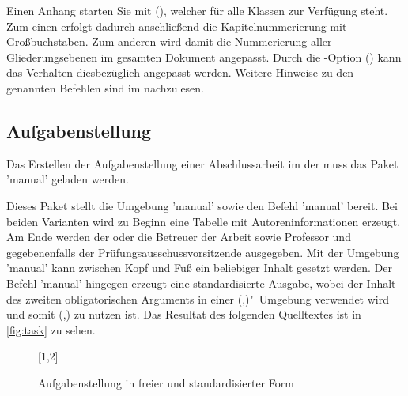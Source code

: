 \documentclass[%
  english,ngerman,%
  cdgeometry=no,DIV=12,%
  automark,%
  listof=toc,%
]{tudscrartcl}
\begin{document}
Einen Anhang starten Sie mit (), welcher 
für alle Klassen zur Verfügung steht. Zum einen erfolgt dadurch anschließend 
die Kapitelnummerierung mit Großbuchstaben. Zum anderen wird damit die 
Nummerierung aller Gliederungsebenen im gesamten Dokument angepasst. Durch die 
\KOMAScript-Option () kann das Verhalten 
diesbezüglich angepasst werden. Weitere Hinweise zu den genannten Befehlen sind 
im \scrguide nachzulesen.


\subsection{Aufgabenstellung}
\label{sec:task}%
%
Das Erstellen der Aufgabenstellung einer Abschlussarbeit im \CD der \TnUD muss 
das Paket 'manual' geladen werden.
%
\begin{Preamble}
\usepackage{tudscrsupervisor}

\end{Preamble}
%
Dieses Paket stellt die Umgebung 'manual' sowie den Befehl 
'manual' bereit. Bei beiden Varianten wird zu Beginn eine 
Tabelle mit Autoreninformationen erzeugt. Am Ende werden der oder die Betreuer 
der Arbeit sowie Professor und gegebenenfalls der Prüfungsausschussvorsitzende 
ausgegeben. Mit der Umgebung 'manual' kann zwischen Kopf und 
Fuß ein beliebiger Inhalt gesetzt werden. Der Befehl 'manual' 
hingegen erzeugt eine standardisierte Ausgabe, wobei der Inhalt des zweiten 
obligatorischen Arguments in einer 
(,)"~Umgebung 
verwendet wird und somit (,)
zu nutzen ist. Das Resultat des folgenden Quelltextes ist in \autoref{fig:task} 
zu sehen. 
%
\begin{figure}
[1,2]
\caption{Aufgabenstellung in freier und standardisierter Form}
\label{fig:task}
\end{figure}
\end{document}

